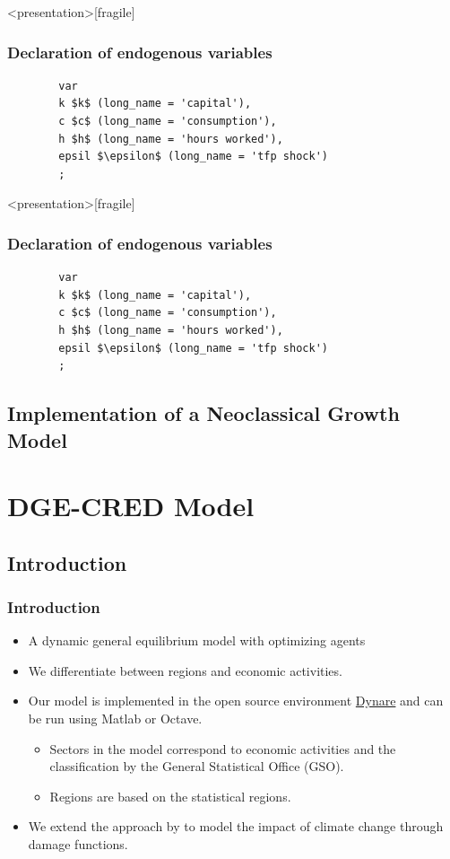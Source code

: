 \documentclass[11pt,aspectratio=169]{beamer}
\begin{document}
\begin{frame}<presentation>[fragile]
\frametitle{Declaration of endogenous variables}
  \begin{lstlisting}
		var 
		k $k$ (long_name = 'capital'),
		c $c$ (long_name = 'consumption'),
		h $h$ (long_name = 'hours worked'),
		epsil $\epsilon$ (long_name = 'tfp shock')
		;
	\end{lstlisting}
\end{frame}

\begin{frame}<presentation>[fragile]
\frametitle{Declaration of endogenous variables}
  \begin{verbatim}
		var 
		k $k$ (long_name = 'capital'),
		c $c$ (long_name = 'consumption'),
		h $h$ (long_name = 'hours worked'),
		epsil $\epsilon$ (long_name = 'tfp shock')
		;
	\end{verbatim}
\end{frame}



\subsection{Implementation of a Neoclassical Growth Model}

\section{DGE-CRED Model}

\subsection{Introduction}
\begin{frame}[plain]
\frametitle{Introduction}
\begin{itemize}
\item A dynamic general equilibrium model with optimizing agents
\item We differentiate between regions and economic activities.
\item Our model is implemented in the open source environment \href{https://www.dynare.org/}{Dynare} and can be run using Matlab or Octave.
\begin{itemize}
	\item Sectors in the model correspond to economic activities and the classification by the General Statistical Office (GSO).
	\item Regions are based on the statistical regions.
\end{itemize}
\item We extend the approach by \cite{nordhaus1993optimal} to model the impact of climate change through damage functions.
\end{itemize}
\end{frame}
\end{document}
